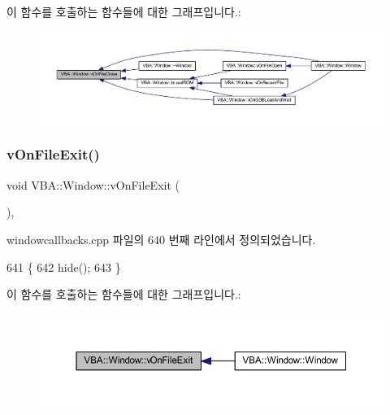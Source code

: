이 함수를 호출하는 함수들에 대한 그래프입니다.\+:
\nopagebreak
\begin{figure}[H]
\begin{center}
\leavevmode
\includegraphics[width=350pt]{class_v_b_a_1_1_window_a9bb969481b9cfea3b5b5bc157ccc0ff6_icgraph}
\end{center}
\end{figure}
\mbox{\label{class_v_b_a_1_1_window_acf22a1b1a9e46ac71e466f160d4e672e}} 
\subsubsection{\texorpdfstring{v\+On\+File\+Exit()}{vOnFileExit()}}
{\footnotesize\ttfamily void V\+B\+A\+::\+Window\+::v\+On\+File\+Exit (\begin{DoxyParamCaption}{ }\end{DoxyParamCaption})\hspace{0.3cm}{\ttfamily [protected]}, {\ttfamily [virtual]}}



windowcallbacks.\+cpp 파일의 640 번째 라인에서 정의되었습니다.


\begin{DoxyCode}
641 \{
642   hide();
643 \}
\end{DoxyCode}
이 함수를 호출하는 함수들에 대한 그래프입니다.\+:
\nopagebreak
\begin{figure}[H]
\begin{center}
\leavevmode
\includegraphics[width=350pt]{class_v_b_a_1_1_window_acf22a1b1a9e46ac71e466f160d4e672e_icgraph}
\end{center}
\end{figure}
\mbox{\label{class_v_b_a_1_1_window_a74bd51bc1e0e699d5523ad7828031394}} 
